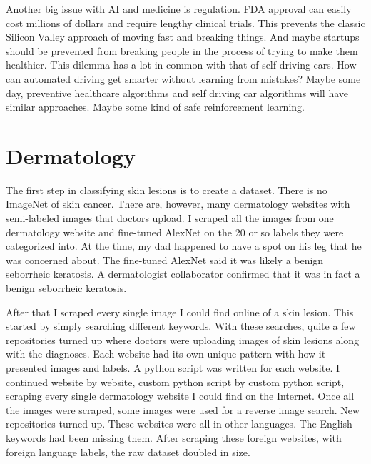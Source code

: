 Another big issue with AI and medicine is regulation.  FDA approval can easily cost millions of dollars and require lengthy clinical trials.  This prevents the classic Silicon Valley approach of moving fast and breaking things.  And maybe startups should be prevented from breaking people in the process of trying to make them healthier.  This dilemma has a lot in common with that of self driving cars.  How can automated driving get smarter without learning from mistakes?  Maybe some day, preventive healthcare algorithms and self driving car algorithms will have similar approaches.  Maybe some kind of safe reinforcement learning.

\section{Dermatology}
The first step in classifying skin lesions is to create a dataset.  There is no ImageNet of skin cancer.  There are, however, many dermatology websites with semi-labeled images that doctors upload.  I scraped all the images from one dermatology website and fine-tuned AlexNet on the 20 or so labels they were categorized into.  At the time, my dad happened to have a spot on his leg that he was concerned about.  The fine-tuned AlexNet said it was likely a benign seborrheic keratosis.  A dermatologist collaborator confirmed that it was in fact a benign seborrheic keratosis.

After that I scraped every single image I could find online of a skin lesion.  This started by simply searching different keywords.  With these searches, quite a few repositories turned up where doctors were uploading images of skin lesions along with the diagnoses.  Each website had its own unique pattern with how it presented images and labels.  A python script was written for each website.  I continued website by website, custom python script by custom python script, scraping every single dermatology website I could find on the Internet.  Once all the images were scraped, some images were used for a reverse image search.  New repositories turned up.  These websites were all in other languages. The English keywords had been missing them.  After scraping these foreign websites, with foreign language labels, the raw dataset doubled in size.

